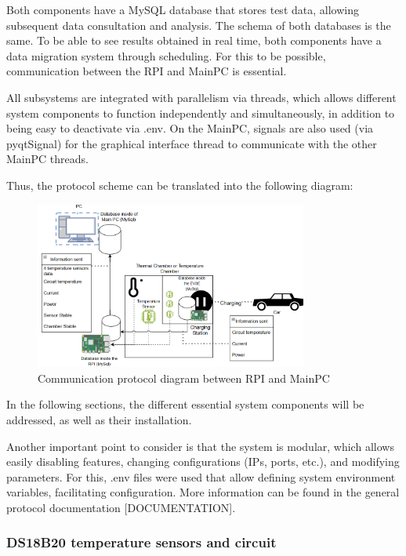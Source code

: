 Both components have a MySQL database that stores test data, allowing subsequent data consultation and analysis. The schema of both databases is the same. To be able to see results obtained in real time, both components have a data migration system through scheduling. For this to be possible, communication between the RPI and MainPC is essential.

All subsystems are integrated with parallelism via threads, which allows different system components to function independently and simultaneously, in addition to being easy to deactivate via .env. On the MainPC, signals are also used (via pyqtSignal) for the graphical interface thread to communicate with the other MainPC threads. 

Thus, the protocol scheme can be translated into the following diagram:
\begin{figure}[H]
    \centering
    \includegraphics[width=0.8\textwidth]{figures/protocol_diagram.png}
    \caption{Communication protocol diagram between RPI and MainPC}
    \label{fig:diagrama_protocolo}
\end{figure}

In the following sections, the different essential system components will be addressed, as well as their installation.

Another important point to consider is that the system is modular, which allows easily disabling features, changing configurations (IPs, ports, etc.), and modifying parameters. For this, .env files were used that allow defining system environment variables, facilitating configuration. More information can be found in the general protocol documentation [DOCUMENTATION].

\subsubsection{DS18B20 temperature sensors and circuit}


